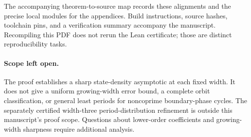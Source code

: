 The accompanying theorem-to-source map records these alignments and the precise local modules for the appendices. Build instructions, source hashes, toolchain pins, and a verification summary accompany the manuscript. Recompiling this PDF does not rerun the Lean certificate; those are distinct reproducibility tasks.

\paragraph{Scope left open.}
The proof establishes a sharp state-density asymptotic at each fixed width. It does not give a uniform growing-width error bound, a complete orbit classification, or general least periods for noncoprime boundary-phase cycles. The separately certified width-three period-distribution refinement is outside this manuscript's proof scope. Questions about lower-order coefficients and growing-width sharpness require additional analysis.
